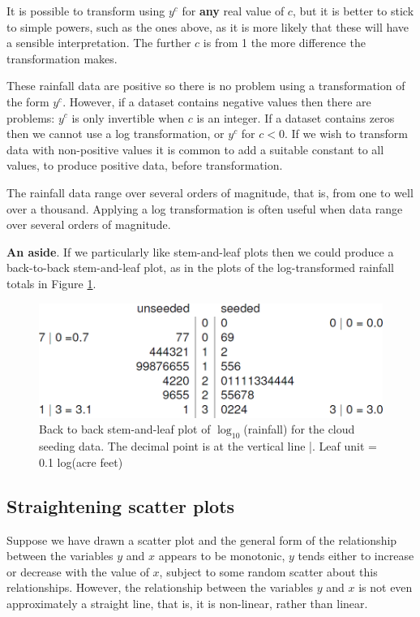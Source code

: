 \documentclass[
  british,
]{book}
\begin{document}
It is possible to transform using \(y^c\) for \textbf{any} real value of \(c\), but it is better to stick to simple powers, such as the ones above, as it is more likely that these will have a sensible interpretation. The further \(c\) is from 1 the more difference the transformation makes.

These rainfall data are positive so there is no problem using a transformation of the form \(y^c\). However, if a dataset contains negative values then there are problems: \(y^c\) is only invertible when \(c\) is an integer. If a dataset contains zeros then we cannot use a log transformation, or \(y^c\) for \(c < 0\). If we wish to transform data with non-positive values it is common to add a suitable constant to all values, to produce positive data, before transformation.

The rainfall data range over several orders of magnitude, that is, from one to well over a thousand. Applying a log transformation is often useful when data range over several orders of magnitude.

\textbf{An aside}. If we particularly like stem-and-leaf plots then we could produce a back-to-back stem-and-leaf plot, as in the plots of the log-transformed rainfall totals in Figure \ref{fig:cloudstem}.

\begin{figure}

{\centering \includegraphics[width=0.8\linewidth]{images/cloud_stem} 

}

\caption{Back to back stem-and-leaf plot of $\log_{10}$(rainfall) for the cloud seeding data. The decimal point is at the vertical line |. Leaf unit = 0.1 log(acre feet)}\label{fig:cloudstem}
\end{figure}
\FloatBarrier

\hypertarget{straighten}{%
\subsection{Straightening scatter plots}\label{straighten}}

Suppose we have drawn a scatter plot and the general form of the relationship between the variables \(y\) and \(x\) appears to be monotonic, \(y\) tends either to increase or decrease with the value of \(x\), subject to some random scatter about this relationships. However, the relationship between the variables \(y\) and \(x\) is not even approximately a straight line, that is, it is non-linear, rather than linear.
\end{document}
